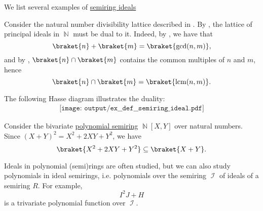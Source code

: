 \begin{example}\label{ex:def:semiring_ideal}
  We list several examples of \hyperref[def:semiring_ideal]{semiring ideals}
  \begin{thmenum}
     Consider the natural number divisibility lattice described in . By , the lattice of principal ideals in \( \BbbN \) must be dual to it. Indeed, by , we have that
    \begin{equation*}
      \braket{n} + \braket{m} = \braket{ \gcd(n, m) },
    \end{equation*}
    and by , \( \braket{n} \cap \braket{m} \) contains the common multiples of \( n \) and \( m \), hence
    \begin{equation*}
      \braket{n} \cap \braket{m} = \braket{ \lcm(n, m) }.
    \end{equation*}

    The following Hasse diagram illustrates the duality:
    \begin{equation}\label{eq:thm:free_semimodule_universal_property/diagram}
      \begin{aligned}
        \texttt{[image: output/ex\_\_def\_\_semiring\_ideal.pdf]}
      \end{aligned}
    \end{equation}

     Consider the bivariate \hyperref[def:polynomial_semiring]{polynomial semiring} \( \BbbN[X, Y] \) over natural numbers. Since \( (X + Y)^2 = X^2 + 2XY + Y^2 \), we have
    \begin{equation*}
      \braket{ X^2 + 2XY + Y^2 } \subseteq \braket{ X + Y }.
    \end{equation*}

     Ideals in polynomial (semi)rings are often studied, but we can also study polynomials in ideal semirings, i.e. polynomials over the semiring \( \mscrI \) of ideals of a semiring \( R \). For example,
    \begin{equation*}
      I^2 J + H
    \end{equation*}
    is a trivariate polynomial function over \( \mscrI \).
  \end{thmenum}
\end{example}

